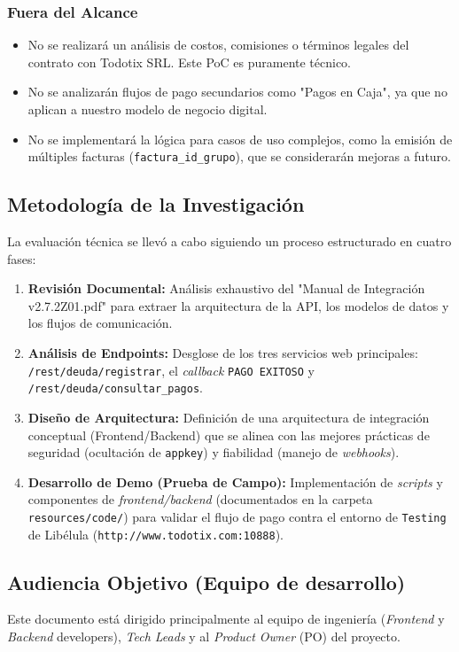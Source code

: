         \subsubsection*{Fuera del Alcance}
            \begin{itemize}
                \item No se realizará un análisis de costos, comisiones o términos legales del contrato con Todotix SRL. Este PoC es puramente técnico.
                \item No se analizarán flujos de pago secundarios como "Pagos en Caja", ya que no aplican a nuestro modelo de negocio digital.
                \item No se implementará la lógica para casos de uso complejos, como la emisión de múltiples facturas (\texttt{factura\_id\_grupo}), que se considerarán mejoras a futuro.
            \end{itemize}

    \subsection{Metodología de la Investigación}
        La evaluación técnica se llevó a cabo siguiendo un proceso estructurado en cuatro fases:
        \begin{enumerate}
            \item \textbf{Revisión Documental:} Análisis exhaustivo del "Manual de Integración v2.7.2Z01.pdf" para extraer la arquitectura de la API, los modelos de datos y los flujos de comunicación.
            \item \textbf{Análisis de Endpoints:} Desglose de los tres servicios web principales: \texttt{/rest/deuda/registrar}, el \emph{callback} \texttt{PAGO EXITOSO} y \texttt{/rest/deuda/consultar\_pagos}.
            \item \textbf{Diseño de Arquitectura:} Definición de una arquitectura de integración conceptual (Frontend/Backend) que se alinea con las mejores prácticas de seguridad (ocultación de \texttt{appkey}) y fiabilidad (manejo de \emph{webhooks}).
            \item \textbf{Desarrollo de Demo (Prueba de Campo):} Implementación de \emph{scripts} y componentes de \emph{frontend/backend} (documentados en la carpeta \texttt{resources/code/}) para validar el flujo de pago contra el entorno de \texttt{Testing} de Libélula (\texttt{http://www.todotix.com:10888}).
        \end{enumerate}


    \subsection{Audiencia Objetivo (Equipo de desarrollo)}
    Este documento está dirigido principalmente al equipo de ingeniería (\emph{Frontend} y \emph{Backend} developers), 
    \emph{Tech Leads} y al \emph{Product Owner} (PO) del proyecto.

